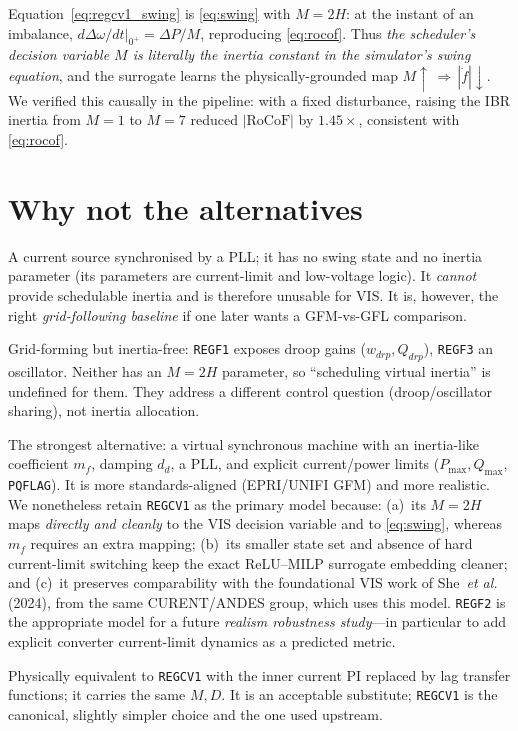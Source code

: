 \documentclass[11pt,a4paper]{article}
\newcommand{\model}[1]{\texttt{#1}}
\begin{document}
Equation~\eqref{eq:regcv1_swing} is \eqref{eq:swing} with $M{=}2H$: at the instant
of an imbalance, $d\Delta\omega/dt|_{0^+}=\Delta P/M$, reproducing
\eqref{eq:rocof}. Thus \emph{the scheduler's decision variable $M$ is literally
the inertia constant in the simulator's swing equation}, and the surrogate learns
the physically-grounded map $M\!\uparrow\,\Rightarrow\,|\dot f|\!\downarrow$. We
verified this causally in the pipeline: with a fixed disturbance, raising the
IBR inertia from $M{=}1$ to $M{=}7$ reduced $|\mathrm{RoCoF}|$ by $1.45\times$,
consistent with \eqref{eq:rocof}.

\section{Why not the alternatives}
\begin{description}[leftmargin=1.4em,style=nextline]
\item[\model{REGCA1} (grid-following).] A current source synchronised by a PLL; it
has no swing state and no inertia parameter (its parameters are current-limit and
low-voltage logic). It \emph{cannot} provide schedulable inertia and is therefore
unusable for VIS. It is, however, the right \emph{grid-following baseline} if one
later wants a GFM-vs-GFL comparison.
\item[\model{REGF1} (droop), \model{REGF3} (dVOC).] Grid-forming but inertia-free:
\model{REGF1} exposes droop gains ($w_{drp},Q_{drp}$), \model{REGF3} an oscillator.
Neither has an $M{=}2H$ parameter, so ``scheduling virtual inertia'' is undefined
for them. They address a different control question (droop/oscillator sharing),
not inertia allocation.
\item[\model{REGF2} (EPRI VSM).] The strongest alternative: a virtual synchronous
machine with an inertia-like coefficient $m_f$, damping $d_d$, a PLL, and explicit
current/power limits ($P_{\max},Q_{\max}$, \texttt{PQFLAG}). It is more
standards-aligned (EPRI/UNIFI GFM) and more realistic. We nonetheless retain
\model{REGCV1} as the primary model because: (a)~its $M{=}2H$ maps
\emph{directly and cleanly} to the VIS decision variable and to \eqref{eq:swing},
whereas $m_f$ requires an extra mapping; (b)~its smaller state set and absence of
hard current-limit switching keep the exact ReLU--MILP surrogate embedding
cleaner; and (c)~it preserves comparability with the foundational VIS work of
She~\emph{et al.} (2024), from the same CURENT/ANDES group, which uses this model.
\model{REGF2} is the appropriate model for a future \emph{realism robustness
study}---in particular to add explicit converter current-limit dynamics as a
predicted metric.
\item[\model{REGCV2} (VSG, lag inner loop).] Physically equivalent to
\model{REGCV1} with the inner current PI replaced by lag transfer functions; it
carries the same $M,D$. It is an acceptable substitute; \model{REGCV1} is the
canonical, slightly simpler choice and the one used upstream.
\end{description}
\end{document}
